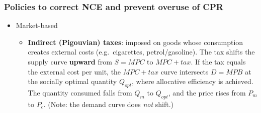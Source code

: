 \subsubsection*{Policies to correct NCE and prevent overuse of CPR}
\begin{itemize}
  \item Market-based
  \begin{itemize}
    \item \textbf{Indirect (Pigouvian) taxes}: imposed on goods whose consumption creates external costs (e.g.\ cigarettes, petrol/gasoline). The tax shifts the supply curve \textbf{upward} from $S = MPC$ to $MPC + tax$. If the tax equals the external cost per unit, the $MPC + tax$ curve intersects $D = MPB$ at the socially optimal quantity $Q_{opt}$, where allocative efficiency is achieved. The quantity consumed falls from $Q_m$ to $Q_{opt}$, and the price rises from $P_m$ to $P_c$. (Note: the demand curve does \textit{not} shift.)


\end{itemize}
\end{itemize}
